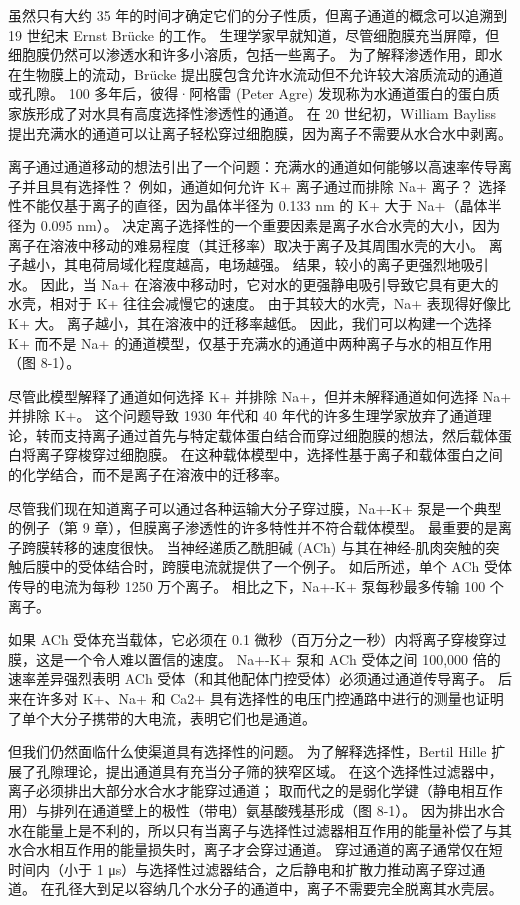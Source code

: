 虽然只有大约 35 年的时间才确定它们的分子性质，但离子通道的概念可以追溯到 19 世纪末 Ernst Brücke 的工作。 
生理学家早就知道，尽管细胞膜充当屏障，但细胞膜仍然可以渗透水和许多小溶质，包括一些离子。 
为了解释渗透作用，即水在生物膜上的流动，Brücke 提出膜包含允许水流动但不允许较大溶质流动的通道或孔隙。 
100 多年后，彼得·阿格雷 (Peter Agre) 发现称为水通道蛋白的蛋白质家族形成了对水具有高度选择性渗透性的通道。 
在 20 世纪初，William Bayliss 提出充满水的通道可以让离子轻松穿过细胞膜，因为离子不需要从水合水中剥离。


离子通过通道移动的想法引出了一个问题：充满水的通道如何能够以高速率传导离子并且具有选择性？ 
例如，通道如何允许 K+ 离子通过而排除 Na+ 离子？ 
选择性不能仅基于离子的直径，因为晶体半径为 0.133 nm 的 K+ 大于 Na+（晶体半径为 0.095 nm）。 
决定离子选择性的一个重要因素是离子水合水壳的大小，因为离子在溶液中移动的难易程度（其迁移率）取决于离子及其周围水壳的大小。 
离子越小，其电荷局域化程度越高，电场越强。 
结果，较小的离子更强烈地吸引水。 
因此，当 Na+ 在溶液中移动时，它对水的更强静电吸引导致它具有更大的水壳，相对于 K+ 往往会减慢它的速度。 
由于其较大的水壳，Na+ 表现得好像比 K+ 大。 离子越小，其在溶液中的迁移率越低。 
因此，我们可以构建一个选择 K+ 而不是 Na+ 的通道模型，仅基于充满水的通道中两种离子与水的相互作用（图 8-1）。


尽管此模型解释了通道如何选择 K+ 并排除 Na+，但并未解释通道如何选择 Na+ 并排除 K+。 
这个问题导致 1930 年代和 40 年代的许多生理学家放弃了通道理论，转而支持离子通过首先与特定载体蛋白结合而穿过细胞膜的想法，然后载体蛋白将离子穿梭穿过细胞膜。 
在这种载体模型中，选择性基于离子和载体蛋白之间的化学结合，而不是离子在溶液中的迁移率。


尽管我们现在知道离子可以通过各种运输大分子穿过膜，Na+-K+ 泵是一个典型的例子（第 9 章），但膜离子渗透性的许多特性并不符合载体模型。 
最重要的是离子跨膜转移的速度很快。 
当神经递质乙酰胆碱 (ACh) 与其在神经-肌肉突触的突触后膜中的受体结合时，跨膜电流就提供了一个例子。 
如后所述，单个 ACh 受体传导的电流为每秒 1250 万个离子。 
相比之下，Na+-K+ 泵每秒最多传输 100 个离子。


如果 ACh 受体充当载体，它必须在 0.1 微秒（百万分之一秒）内将离子穿梭穿过膜，这是一个令人难以置信的速度。 
Na+-K+ 泵和 ACh 受体之间 100,000 倍的速率差异强烈表明 ACh 受体（和其他配体门控受体）必须通过通道传导离子。 
后来在许多对 K+、Na+ 和 Ca2+ 具有选择性的电压门控通路中进行的测量也证明了单个大分子携带的大电流，表明它们也是通道。

但我们仍然面临什么使渠道具有选择性的问题。 
为了解释选择性，Bertil Hille 扩展了孔隙理论，提出通道具有充当分子筛的狭窄区域。 
在这个选择性过滤器中，离子必须排出大部分水合水才能穿过通道； 取而代之的是弱化学键（静电相互作用）与排列在通道壁上的极性（带电）氨基酸残基形成（图 8-1）。 
因为排出水合水在能量上是不利的，所以只有当离子与选择性过滤器相互作用的能量补偿了与其水合水相互作用的能量损失时，离子才会穿过通道。 
穿过通道的离子通常仅在短时间内（小于 1 μs）与选择性过滤器结合，之后静电和扩散力推动离子穿过通道。 
在孔径大到足以容纳几个水分子的通道中，离子不需要完全脱离其水壳层。


